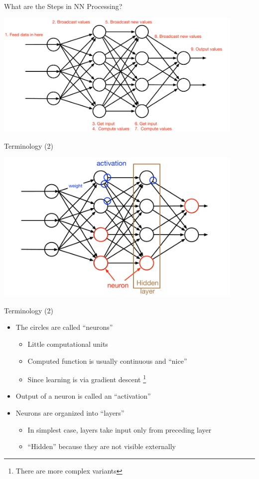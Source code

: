 \documentclass[aspectratio=169]{beamer}
\begin{document}
\begin{frame}{What are the Steps in NN Processing?}

\includegraphics[width=0.9\textwidth]{lectFF/nnSteps.pdf}
\end{frame}
\begin{frame}{Terminology (2)}

\includegraphics[width=0.9\textwidth]{lectFF/nnTerms.pdf}
\end{frame}
\begin{frame}{Terminology (2)}

\begin{itemize}
	\item The circles are called ``neurons''
	\begin{itemize}
                \item Little computational units
		\item Computed function  is usually continuous and ``nice''
		\item Since learning is via gradient descent \footnote{There are more complex variants}
	\end{itemize}	
	\item Output of a neuron is called an ``activation''
	\item Neurons are organized into ``layers''
	\begin{itemize}
                \item In simplest case, layers take input only from preceding layer
                \item ``Hidden'' because they are not visible externally
	\end{itemize}	
\end{itemize}
\end{frame}
\end{document}
